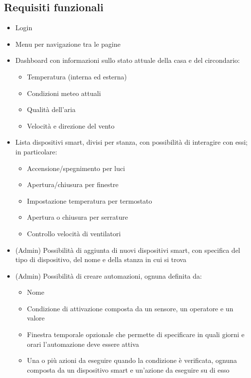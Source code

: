 \documentclass[a4paper,12pt]{article}
\begin{document}
\subsection{Requisiti funzionali}
\begin{itemize}
    \item Login
    \item Menu per navigazione tra le pagine 
    \item Dashboard con informazioni sullo stato attuale della casa e del circondario:
    \begin{itemize}
        \item Temperatura (interna ed esterna)
        \item Condizioni meteo attuali
        \item Qualità dell'aria
        \item Velocità e direzione del vento
    \end{itemize}
    \item Lista dispositivi smart, divisi per stanza, con possibilità di interagire con essi; in particolare:
    \begin{itemize}
        \item Accensione/spegnimento per luci
        \item Apertura/chiusura per finestre
        \item Impostazione temperatura per termostato
        \item Apertura o chiusura per serrature
        \item Controllo velocità di ventilatori
    \end{itemize}
    \item (Admin) Possibilità di aggiunta di nuovi dispositivi smart, con specifica del tipo di dispositivo, del nome e della stanza in cui si trova
    \item (Admin) Possibilità di creare automazioni, ognuna definita da:
    \begin{itemize}
        \item Nome
        \item Condizione di attivazione composta da un sensore, un operatore e un valore
        \item Finestra temporale opzionale che permette di specificare in quali giorni e orari l'automazione deve essere attiva
        \item Una o più azioni da eseguire quando la condizione è verificata, ognuna composta da un dispositivo smart e un'azione da eseguire su di esso
    \end{itemize}

\end{itemize}
\end{document}
